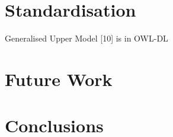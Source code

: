 \documentclass{acm_proc_article-sp}
\begin{document}
\section{Standardisation}
Generalised Upper Model [10] is in OWL-DL

\section{Future Work}
\section{Conclusions}







\balancecolumns
\end{document}
